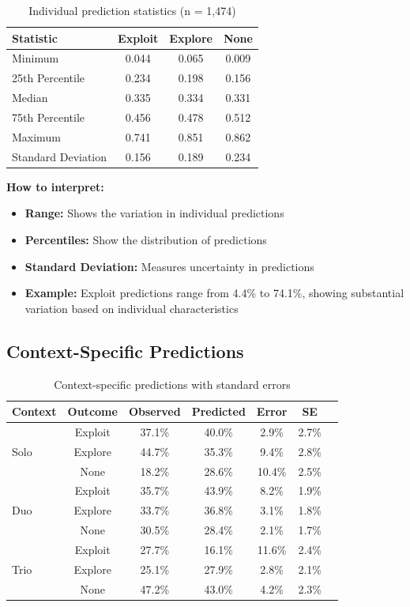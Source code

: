 \documentclass[11pt]{article}
\begin{document}
\begin{table}[h]
\centering
\begin{tabular}{lccc}
\toprule
\textbf{Statistic} & \textbf{Exploit} & \textbf{Explore} & \textbf{None} \\
\midrule
Minimum & 0.044 & 0.065 & 0.009 \\
25th Percentile & 0.234 & 0.198 & 0.156 \\
Median & 0.335 & 0.334 & 0.331 \\
75th Percentile & 0.456 & 0.478 & 0.512 \\
Maximum & 0.741 & 0.851 & 0.862 \\
Standard Deviation & 0.156 & 0.189 & 0.234 \\
\bottomrule
\end{tabular}
\caption{Individual prediction statistics (n = 1,474)}
\end{table}

\textbf{How to interpret:}
\begin{itemize}
    \item \textbf{Range:} Shows the variation in individual predictions
    \item \textbf{Percentiles:} Show the distribution of predictions
    \item \textbf{Standard Deviation:} Measures uncertainty in predictions
    \item \textbf{Example:} Exploit predictions range from 4.4\% to 74.1\%, showing substantial variation based on individual characteristics
\end{itemize}

\subsection{Context-Specific Predictions}

\begin{table}[h]
\centering
\begin{tabular}{lcccccc}
\toprule
\textbf{Context} & \textbf{Outcome} & \textbf{Observed} & \textbf{Predicted} & \textbf{Error} & \textbf{SE} \\
\midrule
\multirow{3}{*}{Solo} & Exploit & 37.1\% & 40.0\% & 2.9\% & 2.7\% \\
& Explore & 44.7\% & 35.3\% & 9.4\% & 2.8\% \\
& None & 18.2\% & 28.6\% & 10.4\% & 2.5\% \\
\midrule
\multirow{3}{*}{Duo} & Exploit & 35.7\% & 43.9\% & 8.2\% & 1.9\% \\
& Explore & 33.7\% & 36.8\% & 3.1\% & 1.8\% \\
& None & 30.5\% & 28.4\% & 2.1\% & 1.7\% \\
\midrule
\multirow{3}{*}{Trio} & Exploit & 27.7\% & 16.1\% & 11.6\% & 2.4\% \\
& Explore & 25.1\% & 27.9\% & 2.8\% & 2.1\% \\
& None & 47.2\% & 43.0\% & 4.2\% & 2.3\% \\
\bottomrule
\end{tabular}
\caption{Context-specific predictions with standard errors}
\end{table}
\end{document}
